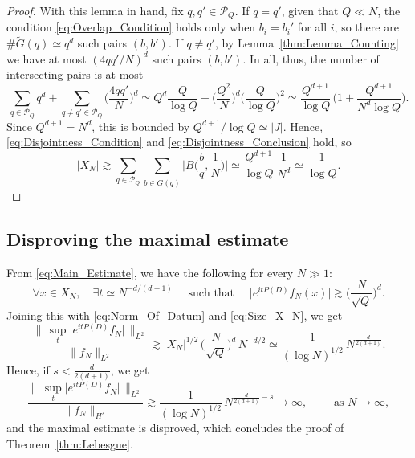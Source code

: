\documentclass[11pt,reqno]{amsart}
\theoremstyle{definition}
\numberwithin{equation}{section}
\theoremstyle{remark}
\begin{document}
\begin{proof}
With this lemma in hand, fix $q, q' \in \mathcal P_Q$. 
If $q = q'$, given that $Q \ll N$, the condition \eqref{eq:Overlap_Condition} holds only when $b_i = b_i'$ for all $i$, 
so there are $\# \widetilde{G}(q) \simeq q^d$ such pairs $(b,b')$. 
If $q \neq q'$, by Lemma~\ref{thm:Lemma_Counting} we have at most $(4qq'/N)^d$ such pairs $(b,b')$.
In all, thus, the number of intersecting pairs is at most 
\begin{equation}
    \sum_{q \in\mathcal P_Q} q^d +  \sum_{q \neq  q' \in \mathcal P_Q} \Big( \frac{4q q'}{N} \Big)^d
    \simeq Q^d \frac{Q}{\log Q} + \Big(\frac{Q^2}{N}\Big)^d \Big( \frac{Q}{\log Q} \Big)^2
    \simeq \frac{Q^{d+1}}{\log Q} \, \Big( 1 + \frac{Q^{d+1}}{N^d \log Q} \Big).
\end{equation}
Since $Q^{d+1} = N^d$, this is bounded by $Q^{d+1}/\log Q \simeq |J|$.
Hence, \eqref{eq:Disjointness_Condition} and \eqref{eq:Disjointness_Conclusion} hold, so  
\begin{equation}\label{eq:Size_X_N}
    |X_N| \gtrsim \sum_{q \in \mathcal P_Q} \sum_{b \in \widetilde{G}(q)} \Big| B\Big( \frac{b}{q}, \frac{1}{N} \Big) \Big| 
    \simeq \frac{Q^{d+1}}{\log Q} \, \frac{1}{N^d}
    \simeq \frac{1}{\log Q}. 
\end{equation}
\end{proof}



\subsection{Disproving the maximal estimate}
From \eqref{eq:Main_Estimate}, we have the following for every $N \gg 1$:
\begin{equation}
    \forall x \in X_N, \quad \exists t \simeq N^{-d/(d+1)} \quad \text{ such that } \quad \Big| e^{itP(D) } f_N(x) \Big| \gtrsim \Big( \frac{N}{\sqrt{Q}} \Big)^d. 
\end{equation}
Joining this with \eqref{eq:Norm_Of_Datum} and \eqref{eq:Size_X_N}, we get 
\begin{equation}
    \frac{ \big\lVert \, \sup_t \big| e^{itP(D) } f_N \big| \, \big\rVert_{L^2}}{\lVert f_N \rVert_{L^2}} 
    \gtrsim |X_N|^{1/2} \, \Big( \frac{N}{\sqrt{Q}} \Big)^d \, N^{-d/2}
    \simeq \frac{1}{(\log N)^{1/2}} \, N^{\frac{d}{2(d+1)} }.
\end{equation}
Hence, if $s < \frac{d}{2(d+1)}$, we get 
\begin{equation}
    \frac{\big\lVert \, \sup_t \big| e^{itP(D) } f_N \big| \, \big\rVert_{L^2}}{\lVert f_N \rVert_{H^s}} 
    \gtrsim \frac{1}{(\log N)^{1/2}} \, N^{\frac{d}{2(d+1)} - s } \to \infty, 
    \qquad \text{ as } N \to \infty, 
\end{equation}
and the maximal estimate is disproved, 
which concludes the proof of Theorem~\ref{thm:Lebesgue}.
\end{document}
